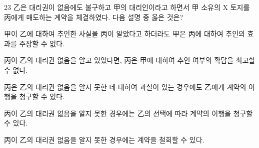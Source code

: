 \begin{question}{23}
乙은 대리권이 없음에도 불구하고 甲의 대리인이라고 하면서 甲 소유의 X 토지를 丙에게 매도하는 계약을 체결하였다. 다음 설명 중 옳은 것은?
\begin{choices}
  \item 甲이 乙에 대하여 추인한 사실을 丙이 알았다고 하더라도 甲은 丙에 대하여 추인의 효과를 주장할 수 없다.
  \item 丙이 乙의 대리권 없음을 알고 있었다면, 丙은 甲에 대하여 추인 여부의 확답을 최고할 수 없다.
  \item 丙은 乙의 대리권 없음을 알지 못한 데 대하여 과실이 있는 경우에도 乙에게 계약의 이행을 청구할 수 있다.
  \item 丙이 乙의 대리권 없음을 알지 못한 경우에는 乙의 선택에 따라 계약의 이행을 청구할 수 있다.
  \item 丙이 乙의 대리권 없음을 알지 못한 경우에는 계약을 철회할 수 있다.
\end{choices}
\end{question}

